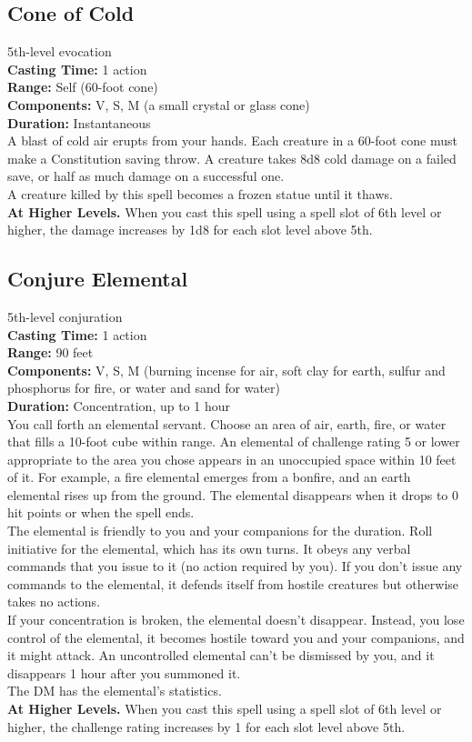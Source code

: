 \documentclass[11pt, A4paper, english]{article}
\begin{document}
		\subsection{Cone of Cold}
5th-level evocation \\
\textbf{Casting Time:} 1 action \\
\textbf{Range:} Self (60-foot cone) \\
\textbf{Components:} V, S, M (a small crystal or glass cone) \\
\textbf{Duration:} Instantaneous \\
A blast of cold air erupts from your hands. Each creature in a 60-foot cone must make a Constitution saving throw. A creature takes 8d8 cold damage on a failed save, or half as much damage on a successful one. \\
A creature killed by this spell becomes a frozen statue until it thaws. \\
\textbf{At Higher Levels.} When you cast this spell using a spell slot of 6th level or higher, the damage increases by 1d8 for each slot level above 5th.

		\subsection{Conjure Elemental}
5th-level conjuration \\
\textbf{Casting Time:} 1 action \\
\textbf{Range:} 90 feet \\
\textbf{Components:} V, S, M (burning incense for air, soft clay for earth, sulfur and phosphorus for fire, or water and sand for water) \\
\textbf{Duration:} Concentration, up to 1 hour \\
You call forth an elemental servant. Choose an area of air, earth, fire, or water that fills a 10-foot cube within range. An elemental of challenge rating 5 or lower appropriate to the area you chose appears in an unoccupied space within  10 feet of it. For example, a fire elemental emerges from a bonfire, and an earth elemental rises up from the ground. The elemental disappears when it drops to 0 hit points or when the spell ends. \\
The elemental is friendly to you and your companions for the duration. Roll initiative for the elemental, which has its own turns. It obeys any verbal commands that you issue to it (no action required by you). If you don’t issue any commands to the elemental, it defends itself from hostile creatures but otherwise takes no actions. \\
If your concentration is broken, the elemental doesn’t disappear. Instead, you lose control of the elemental, it becomes hostile toward you and your companions, and it might attack. An uncontrolled elemental can’t be dismissed by you, and it disappears 1 hour after you summoned it. \\
The DM has the elemental’s statistics. \\
\textbf{At Higher Levels.} When you cast this spell using a spell slot of 6th level or higher, the challenge rating increases by 1 for each slot level above 5th.
\end{document}
